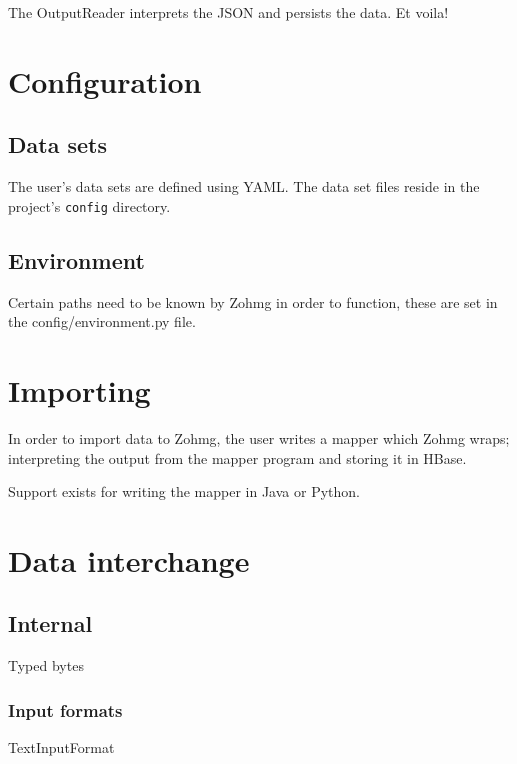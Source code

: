 The OutputReader interprets the JSON and persists the data. Et voila!


\section{Configuration}

\subsection{Data sets}


The user's data sets are defined using YAML. The data set files reside in
the project's \texttt{config} directory.


\subsection{Environment}

Certain paths need to be known by Zohmg in order to function, these are set
in the config/environment.py file.



\section{Importing}

In order to import data to Zohmg, the user writes a mapper which Zohmg wraps;
interpreting the output from the mapper program and storing it in HBase.

Support exists for writing the mapper in Java or Python.



\section{Data interchange}

\subsection{Internal}

Typed bytes


\subsubsection{Input formats}

TextInputFormat

